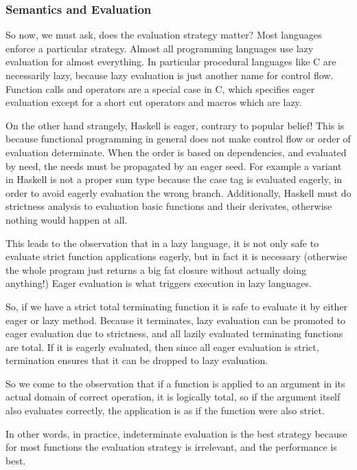 \documentclass{article}
\begin{document}
\subsubsection{Semantics and Evaluation}
So now, we must ask, does the evaluation strategy matter?
Most languages enforce a particular strategy. Almost all programming
languages use lazy evaluation for almost everything. In particular
procedural languages like C are necessarily lazy, because lazy
evaluation is just another name for control flow. Function calls
and operators are a special case in C, which specifies eager evaluation
except for a short cut operators and macros which are lazy.

On the other hand strangely, Haskell is eager, contrary to
popular belief! This is because functional programming in general
does not make control flow or order of evaluation determinate.
When the order is based on dependencies, and evaluated by need,
the needs must be propagated by an eager seed. For example
a variant in Haskell is not a proper sum type because the
case tag is evaluated eagerly, in order to avoid eagerly
evaluation the wrong branch. Additionally, Haskell must
do strictness analysis to evaluation basic functions and their
derivates, otherwise nothing would happen at all. 

This leads to the observation that in a lazy language, it is
not only safe to evaluate strict function applications eagerly,
but in fact it is necessary (otherwise the whole program just
returns a big fat closure without actually doing anything!)
Eager evaluation is what triggers execution in lazy languages.

So, if we have a strict total terminating function 
it is safe to evaluate it by either eager or lazy method.
Because it terminates, lazy evaluation can be promoted to
eager evaluation due to strictness, and all lazily evaluated
terminating functions are total. If it is eagerly evaluated,
then since all eager evaluation is strict, termination ensures
that it can be dropped to lazy evaluation.

So we come to the observation that if a function is applied
to an argument in its actual domain of correct operation,
it is logically total, so if the argument itself also
evaluates correctly, the application is as if the function
were also strict.

In other words, in practice, indeterminate evaluation
is the best strategy because for most functions the
evaluation strategy is irrelevant, and the performance
is best.
\end{document}
